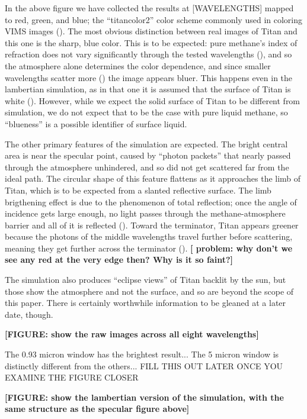 \documentclass{article}
\begin{document}
In the above figure we have collected the results at [WAVELENGTHS] mapped to red, green, and blue; the ``titancolor2'' color scheme commonly used in coloring VIMS images (). The most obvious distinction between real images of Titan and this one is the sharp, blue color. This is to be expected: pure methane's index of refraction does not vary significantly through the tested wavelengths (), and so the atmosphere alone determines the color dependence, and since smaller wavelengths scatter more () the image appears bluer. This happens even in the lambertian simulation, as in that one it is assumed that the surface of Titan is white (). However, while we expect the solid surface of Titan to be different from simulation, we do not expect that to be the case with pure liquid methane, so ``blueness'' is a possible identifier of surface liquid. 

The other primary features of the simulation are expected. The bright central area is near the specular point, caused by ``photon packets'' that nearly passed through the atmosphere unhindered, and so did not get scattered far from the ideal path. The circular shape of this feature flattens as it approaches the limb of Titan, which is to be expected from a slanted reflective surface. The limb brigthening effect is due to the phenomenon of total reflection; once the angle of incidence gets large enough, no light passes through the methane-atmosphere barrier and all of it is reflected (). Toward the terminator, Titan appears greener because the photons of the middle wavelengths travel further before scattering, meaning they get further across the terminator (). \textbf{\color{red}[ problem: why don't we see any red at the very edge then? Why is it so faint?]\color{black}} 

The simulation also produces ``eclipse views'' of Titan backlit by the sun, but those show the atmosphere and not the surface, and so are beyond the scope of this paper. There is certainly worthwhile information to be gleaned at a later date, though. 

\textbf{\color{red} [FIGURE: show the raw images across all eight wavelengths] \color{black}}

\color{Green}The 0.93 micron window has the brightest result... The 5 micron window is distinctly different from the others... FILL THIS OUT LATER ONCE YOU EXAMINE THE FIGURE CLOSER\color{black}

\textbf{\color{red} [FIGURE: show the lambertian version of the simulation, with the same structure as the specular figure above] \color{black}}
\end{document}
